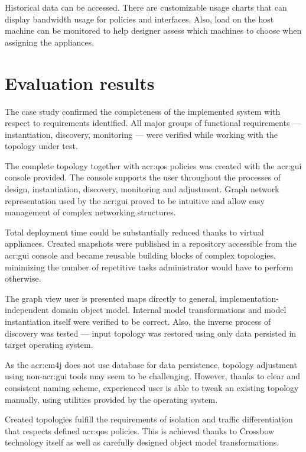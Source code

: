 \documentclass[11pt,openany]{book}
\begin{document}
        Historical data can be accessed. There are customizable usage charts that can display bandwidth usage for
        policies and interfaces. Also, load on the host machine can be monitored to help designer assess which machines
        to choose when assigning the appliances.


    \section{Evaluation results}
    \label{sec:uc:eval}

      The case study confirmed the completeness of the implemented system with respect to requirements identified. All
      major groups of functional requirements --- instantiation, discovery, monitoring --- were verified while working
      with the topology under test.

      The complete topology together with \gls{acr:qos} policies was created with the \gls{acr:gui} console provided.
      The console supports the user throughout the processes of design, instantiation, discovery, monitoring and
      adjustment. Graph network representation used by the \gls{acr:gui} proved to be intuitive and allow easy
      management of complex networking structures.

      Total deployment time could be substantially reduced thanks to virtual appliances. Created snapshots were
      published in a repository accessible from the \gls{acr:gui} console and became reusable building blocks of complex
      topologies, minimizing the number of repetitive tasks administrator would have to perform otherwise.

      The graph view user is presented maps directly to general, implementation-independent domain object model.
      Internal model transformations and model instantiation itself were verified to be correct. Also, the inverse
      process of discovery was tested --- input topology was restored using only data persisted in target operating
      system.

      As the \gls{acr:cm4j} does not use database for data persistence, topology adjustment using non-\gls{acr:gui}
      tools may seem to be challenging. However, thanks to clear and consistent naming scheme, experienced user is able
      to tweak an existing topology manually, using utilities provided by the operating system.

      Created topologies fulfill the requirements of isolation and traffic differentiation that respects defined
      \gls{acr:qos} policies. This is achieved thanks to Crossbow technology itself as well as carefully designed object
      model transformations.
\end{document}
